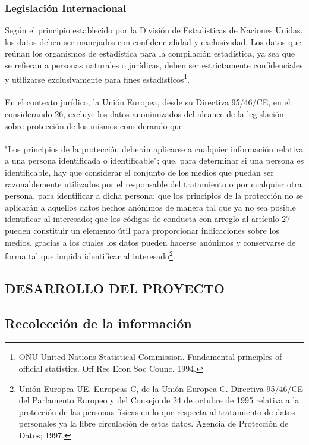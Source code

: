 \documentclass[a4paper,openright,12pt]{book}
\theoremstyle{definition}
\theoremstyle{remark}
\begin{document}
\subsection{Legislación Internacional}
Según el principio establecido por la División de Estadísticas de Naciones Unidas, los datos deben ser manejados con confidencialidad y exclusividad.
Los datos que reúnan los organismos de estadística para la compilación estadística, ya sea que se refieran a personas naturales o jurídicas, deben ser estrictamente confidenciales y utilizarse exclusivamente para fines estadísticos\footnote{ONU United Nations Statistical Commission. Fundamental principles of official statistics. Off Rec Econ Soc Counc. 1994.}.\\\\En el contexto jurídico, la Unión Europea, desde su Directiva 95/46/CE, en el considerando 26, excluye los datos anonimizados del alcance de la legislación sobre protección de los mismos considerando que:\\\\"Los principios de la protección deberán aplicarse a cualquier información relativa a una persona identificada o identificable"; que, para determinar si una persona es identificable, hay que considerar el conjunto de los medios que puedan ser razonablemente utilizados por el responsable del tratamiento o por cualquier otra persona, para identificar a dicha persona; que los principios de la protección no se aplicarán a aquellos datos hechos anónimos de manera tal que ya no sea posible identificar al interesado; que los códigos de conducta con arreglo al artículo 27 pueden constituir un elemento útil para proporcionar indicaciones sobre los medios, gracias a los cuales los datos pueden hacerse anónimos y conservarse de forma tal que impida identificar al interesado\footnote{Unión Europea UE. Europeas C, de la Unión Europea C. Directiva 95/46/CE del Parlamento Europeo y del Consejo de 24 de octubre de 1995 relativa a la protección de las personas físicas en lo que respecta al tratamiento de datos personales ya la libre circulación de estos datos. Agencia de Protección de Datos; 1997.}.

\begin{center}
 \chapter{DESARROLLO DEL PROYECTO}\label{cap.desarrollo}
\end{center}
\section{Recolección de la información}
\end{document}
